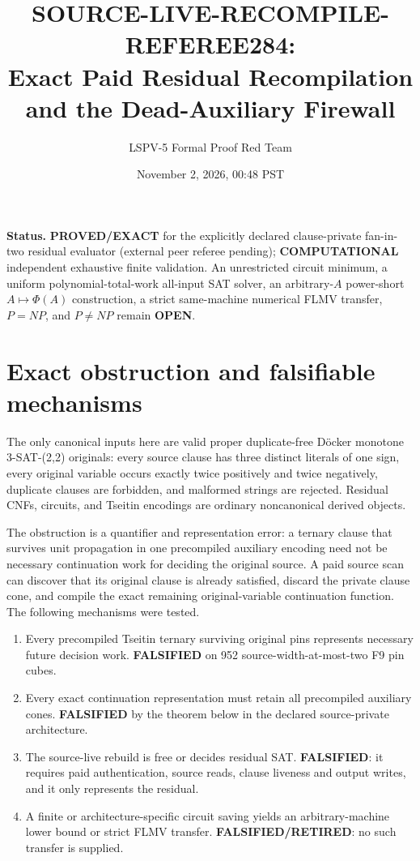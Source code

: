 \documentclass[11pt]{article}
\title{SOURCE-LIVE-RECOMPILE-REFEREE284:\\Exact Paid Residual Recompilation and the Dead-Auxiliary Firewall}
\author{LSPV-5 Formal Proof Red Team}
\date{November 2, 2026, 00:48 PST}
\begin{document}
\maketitle

\noindent\textbf{Status.} \textbf{PROVED/EXACT} for the explicitly declared clause-private fan-in-two residual evaluator (external peer referee pending); \textbf{COMPUTATIONAL} independent exhaustive finite validation. An unrestricted circuit minimum, a uniform polynomial-total-work all-input SAT solver, an arbitrary-$A$ power-short $A\mapsto\Phi(A)$ construction, a strict same-machine numerical FLMV transfer, $P=NP$, and $P\ne NP$ remain \textbf{OPEN}.

\section{Exact obstruction and falsifiable mechanisms}
The only canonical inputs here are valid proper duplicate-free D\"ocker monotone 3-SAT-(2,2) originals: every source clause has three distinct literals of one sign, every original variable occurs exactly twice positively and twice negatively, duplicate clauses are forbidden, and malformed strings are rejected. Residual CNFs, circuits, and Tseitin encodings are ordinary noncanonical derived objects.

The obstruction is a quantifier and representation error: a ternary clause that survives unit propagation in one precompiled auxiliary encoding need not be necessary continuation work for deciding the original source. A paid source scan can discover that its original clause is already satisfied, discard the private clause cone, and compile the exact remaining original-variable continuation function. The following mechanisms were tested.
\begin{enumerate}
\item[(H1)] Every precompiled Tseitin ternary surviving original pins represents necessary future decision work. \textbf{FALSIFIED} on 952 source-width-at-most-two F9 pin cubes.
\item[(H2)] Every exact continuation representation must retain all precompiled auxiliary cones. \textbf{FALSIFIED} by the theorem below in the declared source-private architecture.
\item[(H3)] The source-live rebuild is free or decides residual SAT. \textbf{FALSIFIED}: it requires paid authentication, source reads, clause liveness and output writes, and it only represents the residual.
\item[(H4)] A finite or architecture-specific circuit saving yields an arbitrary-machine lower bound or strict FLMV transfer. \textbf{FALSIFIED/RETIRED}: no such transfer is supplied.
\end{enumerate}
\end{document}
